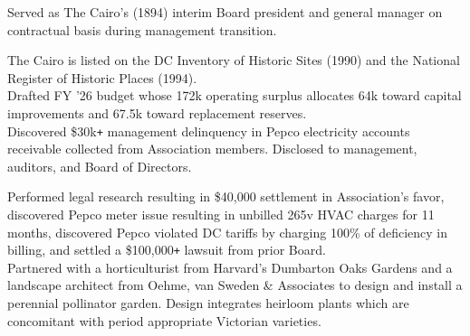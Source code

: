 \documentclass[]{article}
\def\Plus{\texttt{+}}
\begin{document}
Served as The Cairo's (1894) interim Board president and general manager on contractual basis during management transition.

\begin{minipage}[t]{0.48\linewidth}
	\textbullet\hspace{.1em} The Cairo is listed on the DC Inventory of Historic Sites (1990) and the National Register of Historic Places (1994).\\
	\textbullet\hspace{.1em} Drafted FY '26 budget whose 172k operating surplus allocates 64k toward capital improvements and 67.5k toward replacement reserves.\\
	\textbullet\hspace{.1em} Discovered \$30k{\Plus} management delinquency in Pepco electricity accounts receivable collected from Association members. Disclosed to management, auditors, and Board of Directors.
\end{minipage}
\hfill
\begin{minipage}[t]{0.48\linewidth}
	\textbullet\hspace{.1em} Performed legal research resulting in \$40,000 settlement in Association's favor, discovered Pepco meter issue resulting in unbilled 265v HVAC charges for 11 months, discovered Pepco violated DC tariffs by charging 100\% of deficiency in billing, and settled a \$100,000{\Plus} lawsuit from prior Board.\\
	\textbullet\hspace{.1em} Partnered with a horticulturist from Harvard’s Dumbarton Oaks Gardens and a landscape architect from Oehme, van Sweden \& Associates to design and install a perennial pollinator garden. Design integrates heirloom plants which are concomitant with period appropriate Victorian varieties.
\end{minipage}
\end{document}
